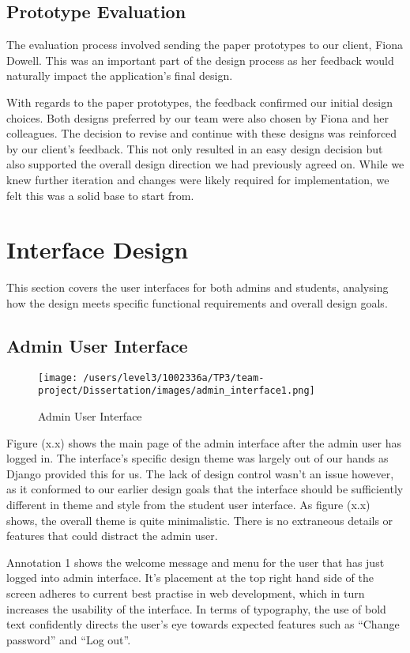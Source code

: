 \documentclass{l3proj}
\begin{document}
\subsection{Prototype Evaluation}

The evaluation process involved sending the paper prototypes to our client, Fiona Dowell. This was an important part of the design process as her feedback would naturally impact the application's final design. 

With regards to the paper prototypes, the feedback confirmed our initial design choices. Both designs preferred by our team were also chosen by Fiona and her colleagues. The decision to revise and continue with these designs was reinforced by our client's feedback. This not only resulted in an easy design decision but also supported the overall design direction we had previously agreed on. While we knew further iteration and changes were likely required for implementation, we felt this was a solid base to start from.

\section{Interface Design}

This section covers the user interfaces for both admins and students, analysing how the design meets specific functional requirements and overall design goals.

\subsection{Admin User Interface}

\begin{figure}[!htb]
\caption{Admin User Interface}
\texttt{[image: /users/level3/1002336a/TP3/team-project/Dissertation/images/admin\_interface1.png]}
\end{figure}

Figure (x.x) shows the main page of the admin interface after the admin user has logged in. The interface's specific design theme was largely out of our hands as Django provided this for us. The lack of design control wasn't an issue however, as it conformed to our earlier design goals that the interface should be sufficiently different in theme and style from the student user interface. As figure (x.x) shows, the overall theme is quite minimalistic. There is no extraneous details or features that could distract the admin user.

Annotation 1 shows the welcome message and menu for the user that has just logged into admin interface. It's placement at the top right hand side of the screen adheres to current best practise in web development, which in turn increases the usability of the interface. In terms of typography, the use of bold text confidently directs the user's eye towards expected features such as ``Change password'' and ``Log out''.
\end{document}
